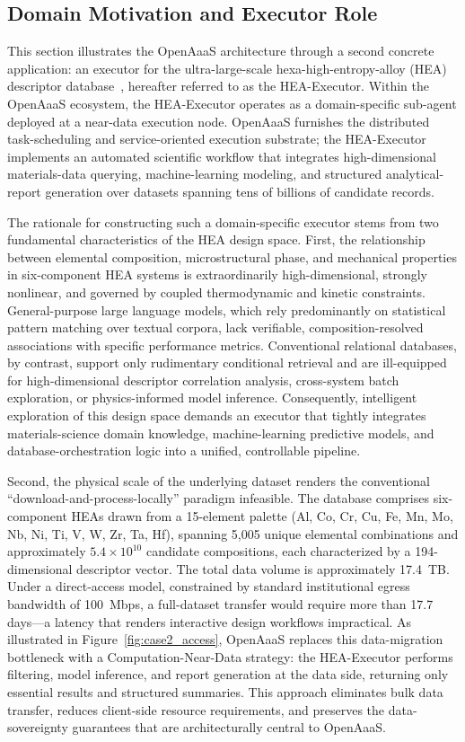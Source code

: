 \documentclass{article}
\begin{document}
\subsection{Domain Motivation and Executor Role}

This section illustrates the OpenAaaS architecture through a second concrete application: an executor for the ultra-large-scale hexa-high-entropy-alloy (HEA) descriptor database~\cite{xiaoya2026}, hereafter referred to as the HEA-Executor. Within the OpenAaaS ecosystem, the HEA-Executor operates as a domain-specific sub-agent deployed at a near-data execution node. OpenAaaS furnishes the distributed task-scheduling and service-oriented execution substrate; the HEA-Executor implements an automated scientific workflow that integrates high-dimensional materials-data querying, machine-learning modeling, and structured analytical-report generation over datasets spanning tens of billions of candidate records.

The rationale for constructing such a domain-specific executor stems from two fundamental characteristics of the HEA design space. First, the relationship between elemental composition, microstructural phase, and mechanical properties in six-component HEA systems is extraordinarily high-dimensional, strongly nonlinear, and governed by coupled thermodynamic and kinetic constraints. General-purpose large language models, which rely predominantly on statistical pattern matching over textual corpora, lack verifiable, composition-resolved associations with specific performance metrics. Conventional relational databases, by contrast, support only rudimentary conditional retrieval and are ill-equipped for high-dimensional descriptor correlation analysis, cross-system batch exploration, or physics-informed model inference. Consequently, intelligent exploration of this design space demands an executor that tightly integrates materials-science domain knowledge, machine-learning predictive models, and database-orchestration logic into a unified, controllable pipeline.

Second, the physical scale of the underlying dataset renders the conventional ``download-and-process-locally'' paradigm infeasible. The database comprises six-component HEAs drawn from a 15-element palette (Al, Co, Cr, Cu, Fe, Mn, Mo, Nb, Ni, Ti, V, W, Zr, Ta, Hf), spanning 5,005 unique elemental combinations and approximately $5.4 \times 10^{10}$ candidate compositions, each characterized by a 194-dimensional descriptor vector. The total data volume is approximately 17.4~TB. Under a direct-access model, constrained by standard institutional egress bandwidth of 100~Mbps, a full-dataset transfer would require more than 17.7 days---a latency that renders interactive design workflows impractical. As illustrated in Figure~\ref{fig:case2_access}, OpenAaaS replaces this data-migration bottleneck with a Computation-Near-Data strategy: the HEA-Executor performs filtering, model inference, and report generation at the data side, returning only essential results and structured summaries. This approach eliminates bulk data transfer, reduces client-side resource requirements, and preserves the data-sovereignty guarantees that are architecturally central to OpenAaaS.
\end{document}
